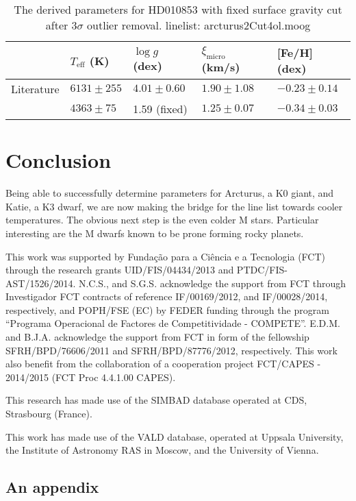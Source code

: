 \documentclass{aa}
\begin{document}
\begin{table*}[htb!]
    \caption{The derived parameters for HD010853 with
    fixed surface gravity cut after 3$\sigma$ outlier removal. linelist: arcturus2Cut4ol.moog}
    \label{tab:hd010853}
    \centering
    \begin{tabular}{lllll}
      \hline\hline
                     & $T_\mathrm{eff}$ (K) &  $\log g$ (dex)  &   $\xi_\mathrm{micro}$ (km/s)  & [Fe/H] (dex)      \\
      \hline
        Literature   & $6131 \pm 255$       &  $4.01 \pm 0.60$ &    $1.90 \pm 1.08$              & $-0.23 \pm 0.14$ \\
      \hline
                     & $4363 \pm 75$        &   1.59 (fixed)   &    $1.25 \pm 0.07$              & $-0.34 \pm 0.03$ \\
      \hline
    \end{tabular}
\end{table*}














\section{Conclusion}
\label{sec:conclusion}
Being able to successfully determine parameters for Arcturus, a K0 giant,
and Katie, a K3 dwarf,
we are now making the bridge for the line list towards cooler temperatures.
The obvious next step is the even colder M stars. Particular interesting
are the M dwarfs known to be prone forming rocky planets.





\begin{acknowledgements}

This work was supported by Funda\c{c}\~ao para a Ci\^encia e a
Tecnologia (FCT) through the research grants UID/FIS/04434/2013 and
PTDC/FIS-AST/1526/2014. N.C.S., and S.G.S. acknowledge the support from
FCT through Investigador FCT contracts of reference IF/00169/2012, and
IF/00028/2014, respectively, and POPH/FSE (EC) by FEDER funding through
the program “Programa Operacional de Factores de Competitividade
- COMPETE”. E.D.M. and B.J.A. acknowledge the support from FCT in
form of the fellowship SFRH/BPD/76606/2011 and SFRH/BPD/87776/2012,
respectively. This work also benefit from the collaboration of a
cooperation project FCT/CAPES - 2014/2015 (FCT Proc 4.4.1.00 CAPES).

This research has made use of the SIMBAD database operated at CDS,
Strasbourg (France).

This work has made use of the VALD database, operated at Uppsala
University, the Institute of Astronomy RAS in Moscow, and the University
of Vienna.

\end{acknowledgements}






\begin{appendix}
\section{An appendix}


\end{appendix}
\end{document}
